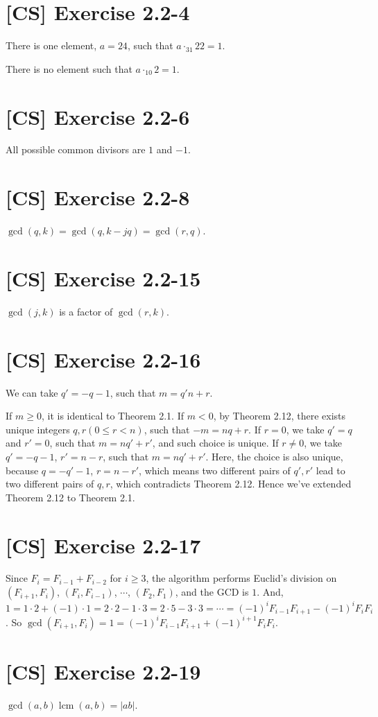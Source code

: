 \documentclass[a4paper,11pt,twocolumn]{article}
\newcommand{\lcm}{\mathop{\mathrm{lcm}}}
\begin{document}
  \section{[CS] Exercise 2.2-4}
  There is one element, $a = 24$, such that $a \cdot_{31} 22 = 1$. \par
  There is no element such that $a \cdot_{10} 2 = 1$.

  \section{[CS] Exercise 2.2-6}
  All possible common divisors are $1$ and $-1$.

  \section{[CS] Exercise 2.2-8}
  $\gcd(q, k) = \gcd(q, k-jq) = \gcd(r, q)$.

  \section{[CS] Exercise 2.2-15}
  $\gcd(j, k)$ is a factor of $\gcd(r, k)$.

  \section{[CS] Exercise 2.2-16}
  We can take $q' = -q-1$, such that $m = q'n + r$. \par
  If $m \geq 0$, it is identical to Theorem 2.1. If $m < 0$, by Theorem 2.12, there exists unique integers $q, r (0 \leq r < n)$, such that $-m = nq + r$. If $r = 0$, we take $q' = q$ and $r' = 0$, such that $m = nq' + r'$, and such choice is unique. If $r \neq 0$, we take $q' =  - q - 1$, $r' = n - r$, such that $m = nq' + r'$. Here, the choice is also unique, because $q = -q' - 1$, $r = n - r'$, which means two different pairs of $q', r'$ lead to two different pairs of $q, r$, which contradicts Theorem 2.12. Hence we've extended Theorem 2.12 to Theorem 2.1.

  \section{[CS] Exercise 2.2-17}
  Since $F_i = F_{i-1} + F_{i-2}$ for $i \geq 3$, the algorithm performs Euclid's division on $(F_{i+1}, F_{i})$, $(F_{i}, F_{i-1})$, $\cdots$, $(F_2, F_1)$, and the GCD is $1$. And, $1 = 1 \cdot 2 + (-1) \cdot 1 = 2 \cdot 2 - 1 \cdot 3 = 2 \cdot 5 - 3 \cdot 3 = \cdots = (-1) ^ i F_{i-1} F_{i+1} - (-1)^i F_i F_i$. So $\gcd(F_{i+1}, F_i) = 1 = (-1)^i F_{i-1} F_{i+1} + (-1)^{i+1} F_i F_i$.

  \section{[CS] Exercise 2.2-19}
  $ \gcd(a, b) \lcm(a, b) = |ab| $.
\end{document}
